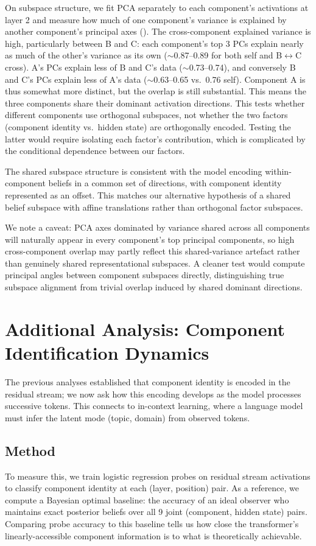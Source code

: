 \documentclass{article}
\begin{document}
On subspace structure, we fit PCA separately to each component's activations at layer 2 and measure how much of one component's variance is explained by another component's principal axes (). The cross-component explained variance is high, particularly between B and C: each component's top 3 PCs explain nearly as much of the other's variance as its own ($\sim$0.87--0.89 for both self and B$\leftrightarrow$C cross). A's PCs explain less of B and C's data ($\sim$0.73--0.74), and conversely B and C's PCs explain less of A's data ($\sim$0.63--0.65 vs.\ 0.76 self). Component A is thus somewhat more distinct, but the overlap is still substantial. This means the three components share their dominant activation directions. This tests whether different components use orthogonal subspaces, not whether the two factors (component identity vs.\ hidden state) are orthogonally encoded. Testing the latter would require isolating each factor's contribution, which is complicated by the conditional dependence between our factors.

The shared subspace structure is consistent with the model encoding within-component beliefs in a common set of directions, with component identity represented as an offset. This matches our alternative hypothesis of a shared belief subspace with affine translations rather than orthogonal factor subspaces.

We note a caveat: PCA axes dominated by variance shared across all components will naturally appear in every component's top principal components, so high cross-component overlap may partly reflect this shared-variance artefact rather than genuinely shared representational subspaces. A cleaner test would compute principal angles between component subspaces directly, distinguishing true subspace alignment from trivial overlap induced by shared dominant directions.


\section{Additional Analysis: Component Identification Dynamics}

The previous analyses established that component identity is encoded in the residual stream; we now ask how this encoding develops as the model processes successive tokens. This connects to in-context learning, where a language model must infer the latent mode (topic, domain) from observed tokens.

\subsection{Method} To measure this, we train logistic regression probes on residual stream activations to classify component identity at each (layer, position) pair. As a reference, we compute a Bayesian optimal baseline: the accuracy of an ideal observer who maintains exact posterior beliefs over all 9 joint (component, hidden state) pairs. Comparing probe accuracy to this baseline tells us how close the transformer's linearly-accessible component information is to what is theoretically achievable.
\end{document}
